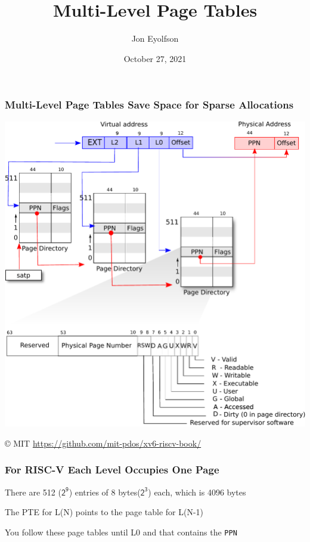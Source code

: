 

\title{Multi-Level Page Tables}
\author{Jon Eyolfson}
\date{October 27, 2021}


  \begin{frame}
    \titlepage
  \end{frame}

  \begin{frame}
    \frametitle{Multi-Level Page Tables Save Space for Sparse Allocations}

    \begin{center}
      \includegraphics[scale=0.5, clip, trim=0cm 8cm 0cm 0cm]{../lecture-19/riscv_pagetable.pdf}
    \end{center}

    © MIT \url{https://github.com/mit-pdos/xv6-riscv-book/}
  \end{frame}

  \begin{frame}
    \frametitle{For RISC-V Each Level Occupies One Page}

    There are 512 ($\mathsf{2^9}$) entries of 8 bytes($\mathsf{2^3}$) each, which is 4096 bytes

    \vspace{2em}

    The PTE for L(N) points to the page table for L(N-1)

    \vspace{2em}

    You follow these page tables until L0 and that contains the \texttt{PPN}
  \end{frame}

